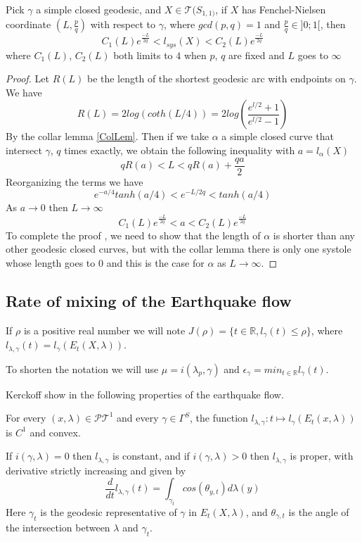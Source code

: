 \begin{lem}
Pick $\gamma$ a simple closed geodesic, and $X \in \mathcal{T}(S_{1,1)}$, if $X$ has Fenchel-Nielsen coordinate $(L,\frac{p}{q})$ with respect to $\gamma$, where $gcd(p,q)=1$ and $\frac{p}{q} \in ]0;1[$, then \[
C_1(L) e^{\frac{-L}{2q}} < l_{sys}(X) < C_2(L) e^{\frac{-L}{2q}}
\]
where $C_1(L)$, $C_2(L)$ both limits to $4$ when $p$, $q$ are fixed and $L$ goes to $\infty$
\end{lem}

\begin{proof}
Let $R(L)$ be the length of the shortest geodesic arc with endpoints on $\gamma$. We have \[
R(L)= 2 log(coth(L/4))=2 log(\frac{e^{l/2}+1}{e^{l/2}-1})
\]
By the collar lemma \ref{ColLem}.
Then if we take $\alpha$ a simple closed curve that intersect $\gamma$, $q$ times exactly, we obtain the following inequality with $a=l_\alpha(X)$ \[
q R(a) < L < q R(a) + \frac{qa}{2}
\]
Reorganizing the terms we have \[
e^{-a/4}tanh(a/4) < e^{-L/2q} < tanh(a/4)
\]
As $a \rightarrow 0$ then $L \rightarrow \infty$
\[
C_1(L) e^{\frac{-L}{2q}} < a < C_2(L) e^{\frac{-L}{2q}}
\]
To complete the proof , we need to show that the length of $\alpha$ is shorter than any other geodesic closed curves, but with the collar lemma there is only one systole whose length goes to $0$ and this is the case for $\alpha$ as $L \rightarrow \infty$.

\end{proof}

\subsection{Rate of mixing of the Earthquake flow}

If $\rho$ is a positive real number we will note $J(\rho)= \{t \in \mathbb{R} , l_\gamma(t) \leq \rho \}$, where $l_{\lambda,\gamma}(t)=l_{\gamma}(E_t(X,\lambda))$.

To shorten the notation we will use $\mu=i(\lambda_p,\gamma)$ and $\epsilon_\gamma = min_{t \in \mathbb{R}} l_\gamma (t)$.


Kerckoff show in \cite{NielsenRealizationPro} the following properties of the earthquake flow.

\begin{prop}
For every $(x,\lambda) \in \mathcal{PT}^1$ and every $\gamma \in \Gamma^S$, the function $l_{\lambda,\gamma}: t \mapsto l_\gamma(E_t(x,\lambda))$ is $C^1$ and convex.

If $i(\gamma,\lambda)=0$ then $l_{\lambda,\gamma}$ is constant, and if $i(\gamma,\lambda)>0$ then $l_{\lambda,\gamma}$ is proper, with derivative strictly increasing and given by \begin{equation}
\frac{d}{dt}l_{\lambda,\gamma}(t)= \int_{\gamma_t}cos(\theta_{y,t})d \lambda(y)
\end{equation}
Here $\gamma_t$ is the geodesic representative of $\gamma$ in $E_t(X,\lambda)$, and $\theta_{\gamma,t}$ is the angle of the intersection between $\lambda$ and $\gamma_t$.
\end{prop}

